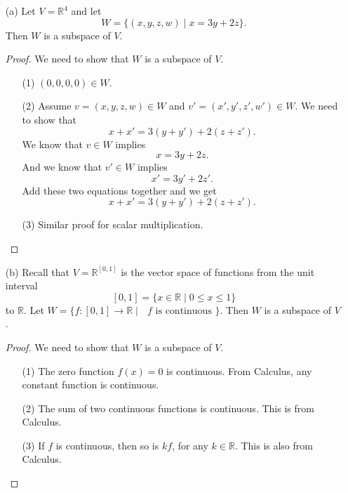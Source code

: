 \documentclass[11pt]{article}
\begin{document}
    \begin{enumerate}
        \item[(a)] Let \(V = \mathbb{R}^4\) and let \[W = \{ (x,y,z,w) \mid x = 3y + 2z \}.\] Then $W$ is a subspace of $V$.
        \begin{proof}
            We need to show that $W$ is a subspace of $V$.
            \begin{enumerate}
                \item[(1)] \((0,0,0,0) \in W\).
                \item[(2)] Assume \(v = (x,y,z,w) \in W\) and \(v' = (x',y',z',w') \in W.\) We need to show that \[x + x' = 3(y + y') + 2(z + z').\] We know that \(v \in W\) implies \[x = 3y + 2z.\] And we know that \(v' \in W\) implies \[x' = 3y' + 2z'.\] Add these two equations together and we get \[x + x' = 3(y + y') + 2(z + z').\]
                \item[(3)] Similar proof for scalar multiplication. 
            \end{enumerate}
        \end{proof} 

        \item[(b)] Recall that \(V = \mathbb{R}^{[0,1]}\) is the vector space of functions from the unit interval \[[0,1] = \{x \in \mathbb{R} \mid 0 \leq x \leq 1\}\] to \(\mathbb{R}.\) Let \(W = \{f : [0,1] \rightarrow \mathbb{R} \mid \text{ $f$ is continuous }\}.\) Then $W$ is a subspace of $V$.
        \begin{proof}
            We need to show that $W$ is a subspace of $V$.
            \begin{enumerate}
                \item[(1)] The zero function \(f(x) = 0\) is continuous. From Calculus, any constant function is continuous.
                \item[(2)] The sum of two continuous functions is continuous. This is from Calculus.
                \item[(3)] If $f$ is continuous, then so is $kf$, for any $k \in \mathbb{R}.$ This is also from Calculus.   
            \end{enumerate}
        \end{proof} 


\end{enumerate}
\end{document}
